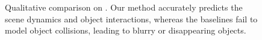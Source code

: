  


\begin{figure}[t]
	
	
	
	
	
	\caption{
		Qualitative comparison on \RobotDB.
		Our method accurately predicts the scene dynamics and object interactions, whereas the baselines fail to model object collisions, leading to blurry or disappearing objects.
	}
	\label{fig: robot qual}
\end{figure}


